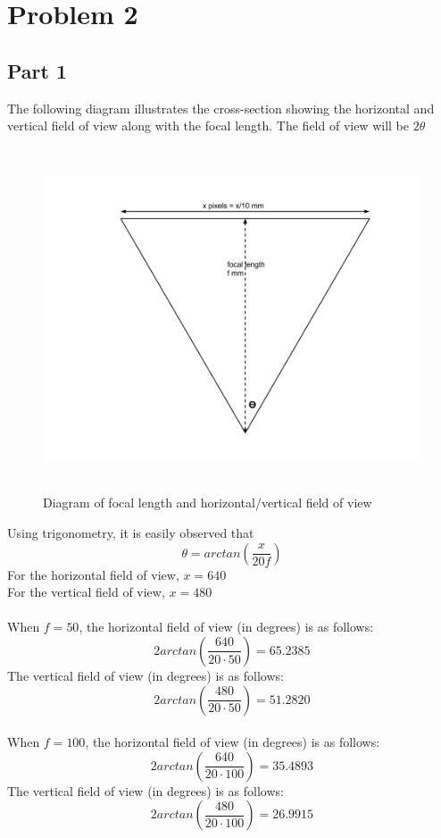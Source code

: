 \documentclass[11pt,psfig]{article}
\begin{document}
\section{Problem 2}

\subsection{Part 1}

The following diagram illustrates the cross-section showing the horizontal and vertical field of view along with the focal length. The field of view will be $2\theta$

\begin{figure}[H]
\centering
\includegraphics[height=4in]{hw1prob2drawing1.png}
\caption{Diagram of focal length and horizontal/vertical field of view}
\end{figure}

Using trigonometry, it is easily observed that
\[
\theta = arctan(\frac{x}{20f})
\]
\newpage
For the horizontal field of view, $x=640$\\
For the vertical field of view, $x=480$ \\
\\
When $f=50$, the horizontal field of view (in degrees) is as follows: 
\[
2arctan(\frac{640}{20 \cdot 50}) = 65.2385
\]
The vertical field of view (in degrees) is as follows:
\[
2arctan(\frac{480}{20 \cdot 50}) = 51.2820
\]
\\
When $f=100$, the horizontal field of view (in degrees) is as follows: 
\[
2arctan(\frac{640}{20 \cdot 100}) = 35.4893
\]
The vertical field of view (in degrees) is as follows:
\[
2arctan(\frac{480}{20 \cdot 100}) = 26.9915
\]
\end{document}
